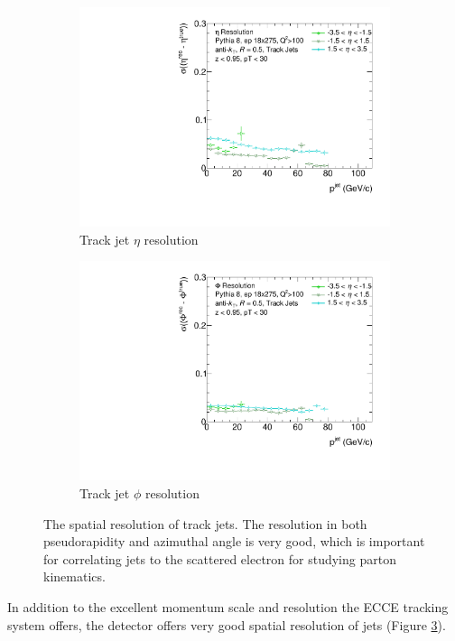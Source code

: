 \begin{figure}[h]
    \centering
    \begin{subfigure}{0.4\textwidth}
        \centering
        \includegraphics[width=\linewidth]{figs/Final_Plots/EtaReso_track_grouped.pdf}
        \caption{Track jet $\eta$ resolution}
        \label{fig:track_eta_resolution}
    \end{subfigure}
    \hfill
    \begin{subfigure}{0.4\textwidth}
        \centering
        \includegraphics[width=\linewidth]{figs/Final_Plots/PhiReso_track_grouped.pdf}
        \caption{Track jet $\phi$ resolution}
        \label{fig:track_phi_resolution}
    \end{subfigure}
    \caption{The spatial resolution of track jets.  The resolution in both pseudorapidity and azimuthal angle is very good, which is important for correlating jets to the scattered electron for studying parton kinematics.  }
    \label{fig:track_spatial_reso_scale}
\end{figure}

In addition to the excellent momentum scale and resolution the ECCE tracking system offers, the detector offers very good spatial resolution of jets (Figure \ref{fig:track_spatial_reso_scale}).    
